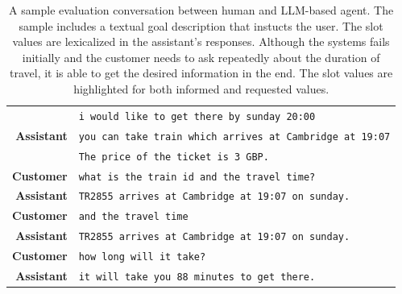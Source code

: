 \begin{table}[]
\begin{tabular}{r|l}
        & \texttt{i would like to get there by {\color{cyan!80!yellow!80!black!100 }sunday 20:00}} \\
        \textbf{Assistant} & \texttt{you can take train which arrives at Cambridge at  {\color{orange!50!yellow!90!black!100!}19:07}} \\
        & \texttt{The price of the ticket is {\color{orange!50!yellow!90!black!100!}3 GBP}.} \\
        \textbf{Customer} & \texttt{what is the {\color{orange!50!yellow!90!black!100!}train id} and the {\color{orange!50!yellow!90!black!100!}travel time?}} \\
        \textbf{Assistant} & \texttt{{\color{orange!50!yellow!90!black!100!}TR2855} arrives at Cambridge at 19:07 on sunday.} \\
        \textbf{Customer} & \texttt{and the travel time} \\
        \textbf{Assistant} & \texttt{{\color{red!100!yellow!90!black!100!}TR2855 arrives at Cambridge at 19:07 on sunday.}} \\
        \textbf{Customer} & \texttt{how long will it take?} \\
        \textbf{Assistant} & \texttt{it will take you {\color{orange!50!yellow!90!black!100!}88 minutes} to get there. }\\
        \bottomrule
    \end{tabular}
    \caption{A sample evaluation conversation between human and LLM-based agent. The sample includes a textual goal description that instucts the user. The slot values are lexicalized in the assistant's responses. Although the systems {\color{red!100!yellow!90!black!100!}fails initially} and the customer needs to ask repeatedly about the duration of travel, it is able to get the desired information in the end. The slot values are highlighted for both {\color{cyan!80!yellow!80!black!100 }informed} and {\color{orange!50!yellow!90!black!100!}requested} values.}
    \label{07:tab:human-1}
\end{table}

